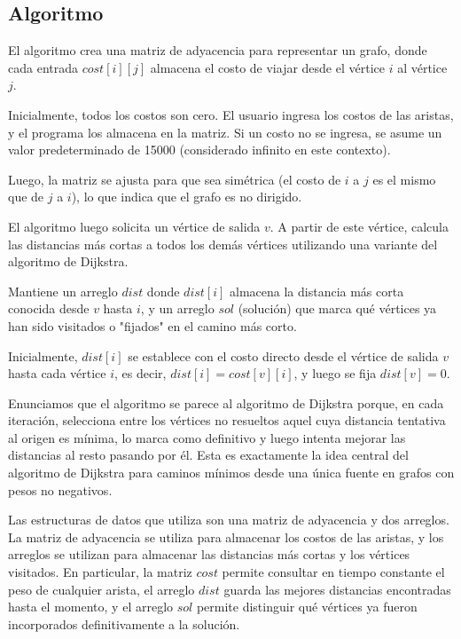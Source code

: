 \subsection{Algoritmo}

El algoritmo crea una matriz de adyacencia para representar un grafo, donde cada entrada $cost[i][j]$ almacena el costo de viajar desde el vértice $i$ al vértice $j$. 

Inicialmente, todos los costos son cero. El usuario ingresa los costos de las aristas, y el programa los almacena en la matriz. Si un costo no se ingresa, se asume un valor predeterminado de 15000 (considerado infinito en este contexto). 

Luego, la matriz se ajusta para que sea simétrica (el costo de $i$ a $j$ es el mismo que de $j$ a $i$), lo que indica que el grafo es no dirigido.

El algoritmo luego solicita un vértice de salida $v$. A partir de este vértice, calcula las distancias más cortas a todos los demás vértices utilizando una variante del algoritmo de Dijkstra. 

Mantiene un arreglo $dist$ donde $dist[i]$ almacena la distancia más corta conocida desde $v$ hasta $i$, y un arreglo $sol$ (solución) que marca qué vértices ya han sido visitados o "fijados" en el camino más corto. 

Inicialmente, $dist[i]$ se establece con el costo directo desde el vértice de salida $v$ hasta cada vértice $i$, es decir, $dist[i]=cost[v][i]$, y luego se fija $dist[v]=0$.

Enunciamos que el algoritmo se parece al algoritmo de Dijkstra porque, en cada iteración, selecciona entre los vértices no resueltos aquel cuya distancia tentativa al origen es mínima, lo marca como definitivo y luego intenta mejorar las distancias al resto pasando por él. Esta es exactamente la idea central del algoritmo de Dijkstra para caminos mínimos desde una única fuente en grafos con pesos no negativos.

Las estructuras de datos que utiliza son una matriz de adyacencia y dos arreglos. La matriz de adyacencia se utiliza para almacenar los costos de las aristas, y los arreglos se utilizan para almacenar las distancias más cortas y los vértices visitados. En particular, la matriz $cost$ permite consultar en tiempo constante el peso de cualquier arista, el arreglo $dist$ guarda las mejores distancias encontradas hasta el momento, y el arreglo $sol$ permite distinguir qué vértices ya fueron incorporados definitivamente a la solución.


